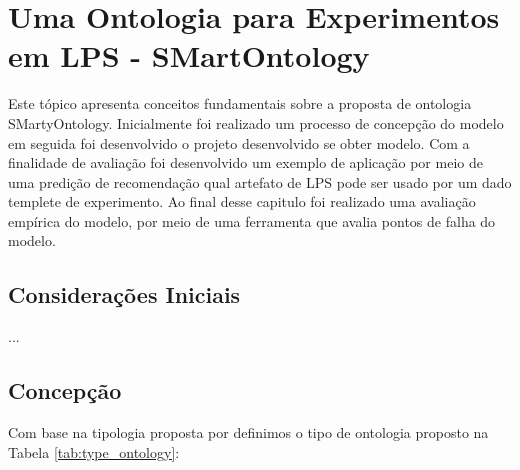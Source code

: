 \chapter{Uma Ontologia para Experimentos em LPS - SMartOntology}
\label{sec:ontologia}

Este tópico apresenta conceitos fundamentais sobre a proposta de ontologia SMartyOntology. Inicialmente foi realizado um processo de concepção do modelo em seguida foi desenvolvido o projeto desenvolvido se obter modelo. Com a finalidade de avaliação foi desenvolvido um exemplo de aplicação por meio de uma predição de recomendação qual artefato de LPS pode ser usado por um dado templete de experimento. Ao final desse capitulo foi realizado uma avaliação empírica do modelo, por meio de uma ferramenta que avalia pontos de falha do modelo.


\section{Considerações Iniciais}
\label{sec:concidaracoes_iniciais}

...


\section{Concepção}
\label{sec:concepcao}

Com base na tipologia proposta por \cite{almeida2003visao} definimos o tipo de ontologia proposto na Tabela \ref{tab:type_ontology}:

